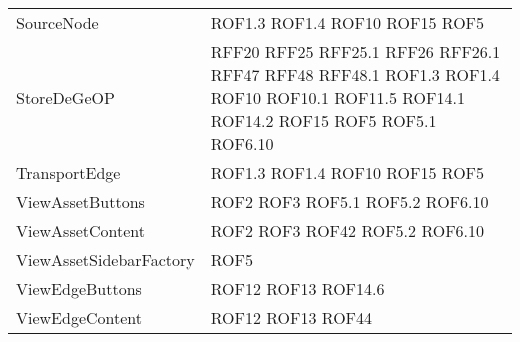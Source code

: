\begin{longtable}{p{5cm}!{\VRule[1pt]}p{2.5cm}}
	SourceNode & ROF1.3 \newline ROF1.4 \newline ROF10 \newline ROF15 \newline ROF5\\
	StoreDeGeOP & RFF20 \newline RFF25 \newline RFF25.1 \newline RFF26 \newline RFF26.1 \newline RFF47 \newline RFF48 \newline RFF48.1 \newline ROF1.3 \newline ROF1.4 \newline ROF10 \newline ROF10.1 \newline ROF11.5 \newline ROF14.1 \newline ROF14.2 \newline ROF15 \newline ROF5 \newline ROF5.1 \newline ROF6.10\\
	TransportEdge & ROF1.3 \newline ROF1.4 \newline ROF10 \newline ROF15 \newline ROF5\\
	ViewAssetButtons & ROF2 \newline ROF3 \newline ROF5.1 \newline ROF5.2 \newline ROF6.10\\
	ViewAssetContent & ROF2 \newline ROF3 \newline ROF42 \newline ROF5.2 \newline ROF6.10\\
	ViewAssetSidebarFactory & ROF5\\
	ViewEdgeButtons & ROF12 \newline ROF13 \newline ROF14.6\\
	ViewEdgeContent & ROF12 \newline ROF13 \newline ROF44\\

\end{longtable}
